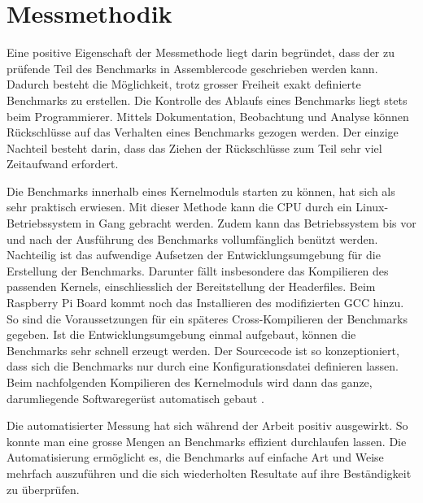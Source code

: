 \section{Messmethodik}
Eine positive Eigenschaft der Messmethode liegt darin begründet, dass der zu prüfende Teil des Benchmarks in Assemblercode geschrieben werden kann. Dadurch besteht die Möglichkeit, trotz grosser Freiheit exakt definierte Benchmarks zu erstellen. Die Kontrolle des Ablaufs eines Benchmarks liegt stets beim Programmierer. Mittels Dokumentation, Beobachtung und Analyse können Rückschlüsse auf das Verhalten eines Benchmarks gezogen werden. Der einzige Nachteil besteht darin, dass das Ziehen der Rückschlüsse zum Teil sehr viel Zeitaufwand erfordert.
\par
Die Benchmarks innerhalb eines Kernelmoduls starten zu können, hat sich als sehr praktisch erwiesen. Mit dieser Methode kann die CPU durch ein Linux-Betriebssystem in Gang gebracht werden. Zudem kann das Betriebssystem bis vor und nach der Ausführung des Benchmarks vollumfänglich benützt werden. Nachteilig ist das aufwendige Aufsetzen der Entwicklungsumgebung für die Erstellung der Benchmarks. Darunter fällt insbesondere das Kompilieren des passenden Kernels, einschliesslich der Bereitstellung der Headerfiles. Beim Raspberry Pi Board kommt noch das Installieren des modifizierten GCC hinzu. So sind die Voraussetzungen für ein späteres Cross-Kompilieren der Benchmarks gegeben. Ist die Entwicklungsumgebung einmal aufgebaut, können die Benchmarks sehr schnell erzeugt werden. Der Sourcecode ist so konzeptioniert, dass sich die Benchmarks nur durch eine Konfigurationsdatei definieren lassen. Beim nachfolgenden Kompilieren des Kernelmoduls wird dann das ganze, darumliegende Softwaregerüst automatisch gebaut .
\par
Die automatisierter Messung hat sich während der Arbeit positiv ausgewirkt. So konnte man eine grosse Mengen an Benchmarks effizient durchlaufen lassen. Die Automatisierung ermöglicht es, die Benchmarks auf einfache Art und Weise mehrfach auszuführen und die sich wiederholten Resultate auf ihre Beständigkeit zu überprüfen.
\par

